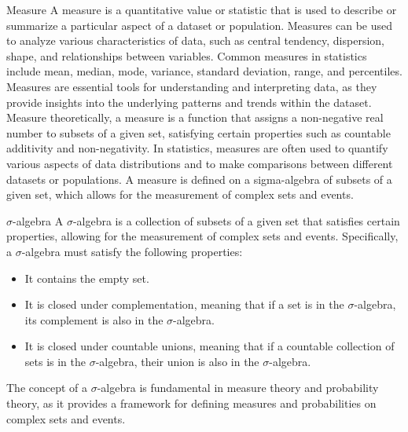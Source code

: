 \documentclass[openany]{book}
\begin{document}
\begin{mydefinition}{Measure}
    A measure is a quantitative value or statistic that is used to describe or summarize a particular aspect of a dataset or population. Measures can be used to analyze various characteristics of data, such as central tendency, dispersion, shape, and relationships between variables. Common measures in statistics include mean, median, mode, variance, standard deviation, range, and percentiles. Measures are essential tools for understanding and interpreting data, as they provide insights into the underlying patterns and trends within the dataset. \\
    Measure theoretically, a measure is a function that assigns a non-negative real number to subsets of a given set, satisfying certain properties such as countable additivity and non-negativity. In statistics, measures are often used to quantify various aspects of data distributions and to make comparisons between different datasets or populations. A measure is defined on a sigma-algebra of subsets of a given set, which allows for the measurement of complex sets and events.
    \begin{mydefinition}{$\sigma$-algebra}
        A $\sigma$-algebra is a collection of subsets of a given set that satisfies certain properties, allowing for the measurement of complex sets and events. Specifically, a $\sigma$-algebra must satisfy the following properties:
        \begin{itemize}
            \item It contains the empty set.
            \item It is closed under complementation, meaning that if a set is in the $\sigma$-algebra, its complement is also in the $\sigma$-algebra.
            \item It is closed under countable unions, meaning that if a countable collection of sets is in the $\sigma$-algebra, their union is also in the $\sigma$-algebra.
        \end{itemize}
        The concept of a $\sigma$-algebra is fundamental in measure theory and probability theory, as it provides a framework for defining measures and probabilities on complex sets and events.
    \end{mydefinition}
\end{mydefinition}
\end{document}
